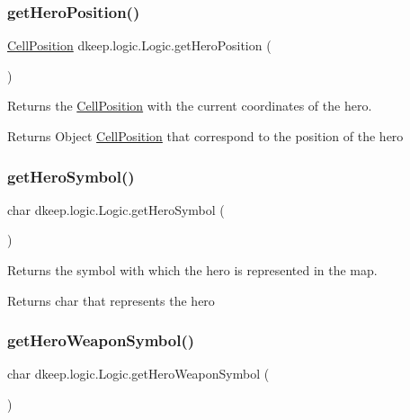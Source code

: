\subsubsection{\texorpdfstring{get\+Hero\+Position()}{getHeroPosition()}}
{\footnotesize\ttfamily \hyperlink{classdkeep_1_1logic_1_1_cell_position}{Cell\+Position} dkeep.\+logic.\+Logic.\+get\+Hero\+Position (\begin{DoxyParamCaption}{ }\end{DoxyParamCaption})}

Returns the \hyperlink{classdkeep_1_1logic_1_1_cell_position}{Cell\+Position} with the current coordinates of the hero. \begin{DoxyReturn}{Returns}
Object \hyperlink{classdkeep_1_1logic_1_1_cell_position}{Cell\+Position} that correspond to the position of the hero 
\end{DoxyReturn}
\mbox{\label{classdkeep_1_1logic_1_1_logic_a8629375c65c00b778f7bc927ad30da72}} 
\subsubsection{\texorpdfstring{get\+Hero\+Symbol()}{getHeroSymbol()}}
{\footnotesize\ttfamily char dkeep.\+logic.\+Logic.\+get\+Hero\+Symbol (\begin{DoxyParamCaption}{ }\end{DoxyParamCaption})}

Returns the symbol with which the hero is represented in the map. \begin{DoxyReturn}{Returns}
char that represents the hero 
\end{DoxyReturn}
\mbox{\label{classdkeep_1_1logic_1_1_logic_a31914ab092089708b8b1a788a90b5bfc}} 
\subsubsection{\texorpdfstring{get\+Hero\+Weapon\+Symbol()}{getHeroWeaponSymbol()}}
{\footnotesize\ttfamily char dkeep.\+logic.\+Logic.\+get\+Hero\+Weapon\+Symbol (\begin{DoxyParamCaption}{ }\end{DoxyParamCaption})}

